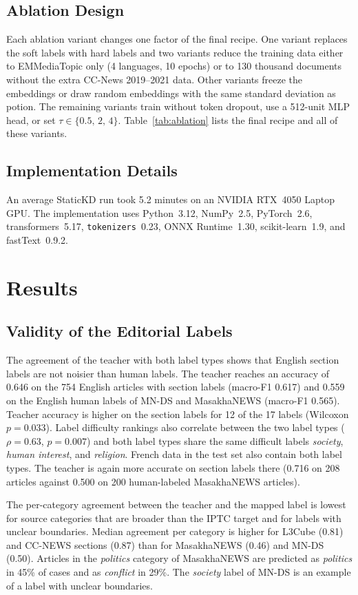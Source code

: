 \documentclass{ieeeaccess}
\begin{document}
\subsection{Ablation Design}
\label{sec:design}
Each ablation variant changes one factor of the final recipe. One variant replaces the soft labels with hard labels and two variants reduce the training data either to EMMediaTopic only (4 languages, 10 epochs) or to 130 thousand documents without the extra CC-News 2019--2021 data. Other variants freeze the embeddings or draw random embeddings with the same standard deviation as potion. The remaining variants train without token dropout, use a 512-unit MLP head, or set $\tau\in\{0.5,\,2,\,4\}$. Table~\ref{tab:ablation} lists the final recipe and all of these variants.

\subsection{Implementation Details}
\label{sec:impl}
An average StaticKD run took 5.2 minutes on an NVIDIA RTX~4050 Laptop GPU. The implementation uses Python~3.12, NumPy~2.5, PyTorch~2.6, transformers~5.17, \texttt{tokenizers}~0.23, ONNX Runtime~1.30, scikit-learn~1.9, and fastText~0.9.2.

\section{Results}
\label{sec:results}
\subsection{Validity of the Editorial Labels}
\label{sec:res-validity}
The agreement of the teacher with both label types shows that English section labels are not noisier than human labels. The teacher reaches an accuracy of 0.646 on the 754 English articles with section labels (macro-F1 0.617) and 0.559 on the English human labels of MN-DS and MasakhaNEWS (macro-F1 0.565). Teacher accuracy is higher on the section labels for 12 of the 17 labels (Wilcoxon $p=0.033$). Label difficulty rankings also correlate between the two label types ($\rho=0.63$, $p=0.007$) and both label types share the same difficult labels \emph{society}, \emph{human interest}, and \emph{religion}. French data in the test set also contain both label types. The teacher is again more accurate on section labels there (0.716 on 208 articles against 0.500 on 200 human-labeled MasakhaNEWS articles).

The per-category agreement between the teacher and the mapped label is lowest for source categories that are broader than the IPTC target and for labels with unclear boundaries. Median agreement per category is higher for L3Cube (0.81) and CC-NEWS sections (0.87) than for MasakhaNEWS (0.46) and MN-DS (0.50). Articles in the \emph{politics} category of MasakhaNEWS are predicted as \emph{politics} in 45\% of cases and as \emph{conflict} in 29\%. The \emph{society} label of MN-DS is an example of a label with unclear boundaries.
\end{document}
